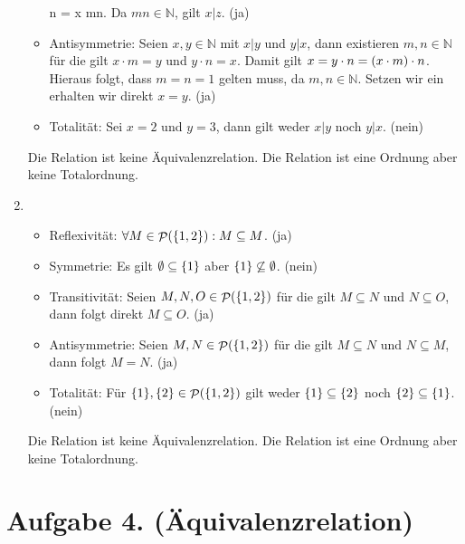 \documentclass[german,12pt]{homework}
\newcommand{\NN}{\mathbb{N}}
\DeclareMathOperator{\pot}{\mathcal{P}}
\DeclarePairedDelimiter{\enbrace}{(}{)}
\DeclarePairedDelimiter{\penbrace}{\{}{\}}
\begin{document}
\begin{enumerate}
\begin{itemize}
             \cdot n = x \cdot mn\). Da \(mn \in \NN\),
            gilt \(x | z\). (ja)
    		\item Antisymmetrie: Seien \(x, y \in \NN\) mit \(x | y\) und \(y |
            x\), dann existieren \(m, n \in \NN\) für die gilt \(x \cdot m =
            y\) und \(y \cdot n = x\). Damit gilt \(x = y \cdot n = \enbrace*{x
            \cdot m} \cdot n\). Hieraus folgt, dass \(m = n = 1\) gelten muss,
            da \(m, n \in \NN\). Setzen wir ein erhalten wir direkt \(x = y\).
            (ja)
    		\item Totalität: Sei \(x = 2\) und \(y = 3\), dann gilt weder \(x |
            y\) noch \(y | x\). (nein)
    	\end{itemize}
    	Die Relation ist keine Äquivalenzrelation. Die Relation ist eine
        Ordnung aber keine Totalordnung.
        \item\ \\
        \begin{itemize}
            \item Reflexivität: \({\forall}M \in \pot\enbrace*{\penbrace*{1,
            2}}: M \subseteq M\). (ja)
    		\item Symmetrie: Es gilt \(\emptyset \subseteq \penbrace*{1}\) aber
            \(\penbrace*{1} \not\subseteq \emptyset\). (nein)
    		\item Transitivität: Seien \(M, N, O \in
            \pot\enbrace*{\penbrace*{1, 2}}\) für die gilt \(M \subseteq N\)
            und \(N \subseteq O\), dann folgt direkt \(M \subseteq O\). (ja)
    		\item Antisymmetrie: Seien \(M, N \in \pot\enbrace*{\penbrace*{1,
            2}}\) für die gilt \(M \subseteq N\) und \(N \subseteq M\), dann
            folgt \(M = N\). (ja)
    		\item Totalität: Für \(\{1\}, \{2\} \in \pot\enbrace*{\penbrace*{1,
            2}}\) gilt weder \(\penbrace*{1} \subseteq \penbrace*{2}\) noch
            \(\penbrace*{2} \subseteq \penbrace*{1}\). (nein)
    	\end{itemize}
    	Die Relation ist keine Äquivalenzrelation. Die Relation ist eine
        Ordnung aber keine Totalordnung.
    \end{enumerate}

    \section*{Aufgabe 4. (Äquivalenzrelation)}
\end{document}
